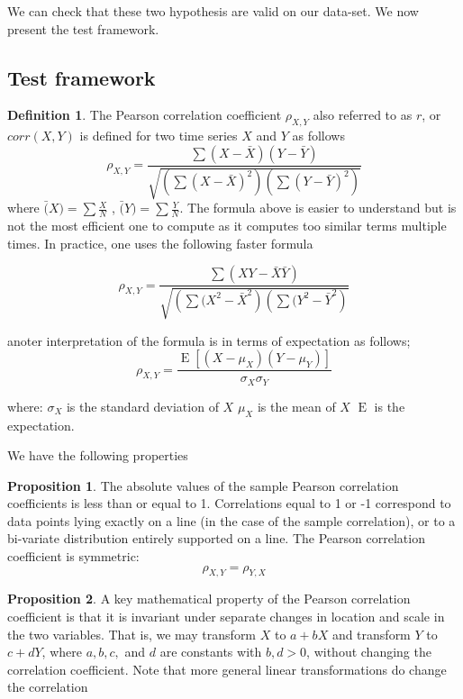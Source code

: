 \documentclass[a4paper]{article}
\theoremstyle{definition}
\theoremstyle{proposition}
\newtheorem{definition}{Definition}[section]
\newtheorem{proposition}{Proposition}[section]
\begin{document}
We can check that these two hypothesis are valid on our data-set. We now present the test framework.

\subsection{Test framework}
\begin{definition}
The Pearson correlation coefficient $\rho_{X,Y}$  also referred to as $r$, or $corr(X,Y)$  is defined for two time series $X$ and $Y$ as follows
\begin{equation}
\rho_{X,Y}= \frac{\sum ( X - \bar{X}) ( Y - \bar{Y} ) }  { \sqrt{  \left( \sum (X - \bar{X}) ^2 \right) \left(  \sum  (Y- \bar{Y}) ^2  \right) } }
\end{equation}
where $\bar(X) = \sum \frac{X}{N}$ , $\bar(Y) = \sum \frac{Y}{N}$. The formula above is easier to understand but is not the most efficient one to compute as it computes too similar terms multiple times. In practice, one uses the following faster formula

\begin{equation}
\rho_{X,Y} = \frac{\sum ( X Y - \bar{X} \bar{Y} ) }  { \sqrt{  \left( \sum (X^2 - \bar{X}^2 \right) \left(  \sum  (Y^2 - \bar{Y} ^2  \right) } }
\end{equation}

anoter interpretation of the formula is in terms of expectation as follows;
\[
\rho_{X,Y}=\frac{\operatorname{E}[(X-\mu_X)(Y-\mu_Y)]}{\sigma_X\sigma_Y} 
\]

where:
$\sigma_X $  is the standard deviation of $X$
$\mu_X$ is the mean of $X$
$\operatorname{E}$ is the expectation.

\end{definition}

We have the following properties
\begin{proposition}
The absolute values of the sample Pearson correlation coefficients is less than or equal to 1. Correlations equal to 1 or -1 correspond to data points lying exactly on a line (in the case of the sample correlation), or to a bi-variate distribution entirely supported on a line. The Pearson correlation coefficient is symmetric: 
\[ 
\rho_{X,Y}= \rho_{Y,X}
\]
\end{proposition}

\begin{proposition}
A key mathematical property of the Pearson correlation coefficient is that it is invariant under separate changes in location and scale in the two variables. That is, we may transform $X$ to $ a + bX$ and transform $Y$ to $c + dY$, where $a, b, c,$ and $d$ are constants with $b, d > 0$, without changing the correlation coefficient. Note that more general linear transformations do change the correlation
\end{proposition}
\end{document}
